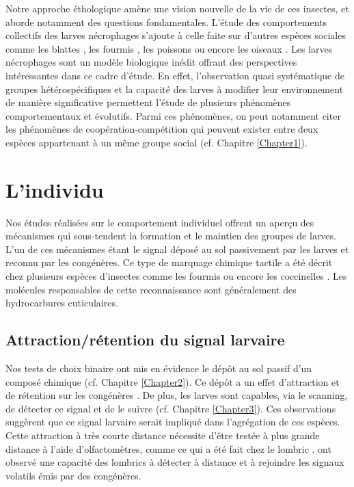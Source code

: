 Notre approche éthologique amène une vision nouvelle de la vie de ces insectes, et  aborde notamment des questions fondamentales. L'étude des comportements collectifs des larves nécrophages s'ajoute à celle faite sur d'autres espèces sociales comme les blattes \cite{canonge_individuel_2011}, les fourmis \cite{dussutour_organisation_2004}, les poissons \cite{robert_does_2013} ou encore les oiseaux \cite{farine_collective_2014}. Les larves nécrophages sont un modèle biologique inédit offrant des perspectives intéressantes dans ce cadre d'étude. En effet, l'observation quasi systématique de groupes hétérospécifiques et la capacité des larves à modifier leur environnement de manière significative permettent l'étude de plusieurs phénomènes comportementaux et évolutifs. Parmi ces phénomènes, on peut notamment citer les phénomènes de coopération-compétition qui peuvent exister entre deux espèces appartenant à un même groupe social (cf. Chapitre \ref{Chapter1}).     



		\section{L'individu}     
Nos études réalisées sur le comportement individuel offrent un aperçu des mécanismes qui sous-tendent la formation et le maintien des groupes de larves. L'un de ces mécanismes étant le signal déposé au sol passivement par les larves et reconnu par les congénères. Ce type de marquage chimique tactile a été décrit chez plusieurs espèces d'insectes comme les fourmis \cite{devigne_how_2006} ou encore les coccinelles \cite{durieux_role_2012}. Les molécules responsables de cette reconnaissance sont généralement des hydrocarbures cuticulaires. 

			\subsection{Attraction/rétention du signal larvaire}
Nos tests de choix binaire ont mis en évidence le dépôt au sol passif d'un composé chimique (cf. Chapitre \ref{Chapter2}). Ce dépôt a un effet d'attraction et de rétention sur les congénères \cite{boulay_evidence_2013}. De plus, les larves sont capables, via le scanning, de détecter ce signal et de le suivre (cf. Chapitre \ref{Chapter3}). Ces observations suggèrent que ce signal larvaire serait impliqué dans l'agrégation de ces espèces. Cette attraction à très courte distance nécessite d'être testée à plus grande distance à l'aide d'olfactomètres, comme ce qui a été fait chez le lombric \cite{zirbes_earthworms_2011}. \citet{zirbes_earthworms_2011} ont observé une capacité des lombrics à détecter à distance et à rejoindre les signaux volatils émis par des congénères.

